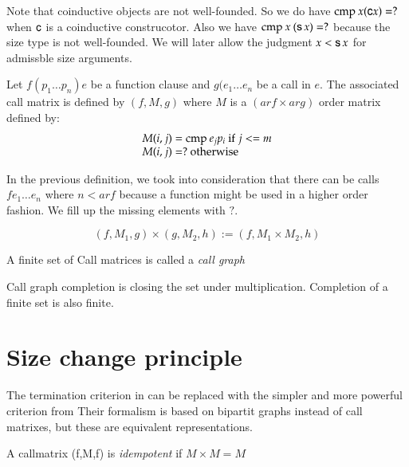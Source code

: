 Note that coinductive objects are not well-founded. So we do have $\mathrm{cmp}\: x (\mathsf{c} x) = ? $ when $\mathsf{c}$ is a coinductive construcotor.
Also we have $\mathrm{cmp}\: x \: (\mathsf{s}\, x) = ? $ because the size type is not well-founded.
We will later allow the judgment $x < \mathsf{s}\, x$ for admissble size arguments.


\begin{definition}
Let $f (p_1 \ldots p_n) e$ be a function clause and $g (e_1 \ldots e_n$ be a call in $e$.
The associated call matrix   is defined by $(f,M,g)$ where $M$ is a $(ar f \times ar g)$ order matrix defined by:
\[ 
\begin{array}[t]{l}
M(i,j) = \mathrm{cmp}\: e_j p_i \mbox{ if } j <= m \\
M(i,j) = ? \mbox{ otherwise} 
\end{array}
\]
\end{definition}
In the previous definition, we took into consideration that there can be calls $f e_1 \ldots e_n$ where $n < ar f$ because a function might be used in a higher order fashion. We fill up the missing elements with $?$. 

\begin{definition}
\[(f,M_1,g) \times (g,M_2,h) := (f,M_1 \times M_2,h)\]
\end{definition}

\begin{definition}
A finite set of Call matrices is called a \emph{call graph}
\end{definition}

\begin{definition}
Call graph completion is closing the set under multiplication.
Completion of a finite set is also finite. 
\end{definition}

\section{Size change principle}

The termination criterion in \cite{abelAltenkirch:predStRec} can be replaced with the
simpler and more powerful criterion from \cite{lee01sizechange}
Their formalism is based on bipartit graphs instead of call matrixes, but these are
equivalent representations.

\begin{definition}
A callmatrix (f,M,f) is \emph{idempotent} if $ M \times M = M $ 
\end{definition}

